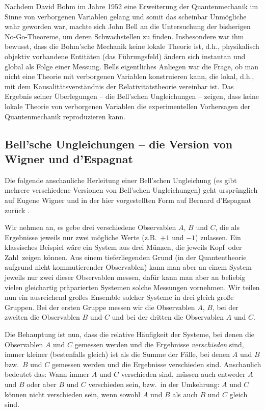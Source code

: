 Nachdem David Bohm im Jahre 1952 
eine Erweiterung der Quantenmechanik im Sinne von verborgenen
Variablen gelang und somit das scheinbar Unm\"ogliche
wahr geworden war, machte sich John Bell an die
Untersuchung der bisherigen No-Go-Theoreme,
um deren Schwachstellen zu finden. Insbesondere
war ihm bewusst, dass die 
Bohm'sche Mechanik
keine lokale Theorie ist, d.h., physikalisch objektiv
vorhandene Entit\"aten (das F\"uhrungsfeld) \"andern
sich instantan und global als Folge einer Messung. 
Bells eigentliches Anliegen war die Frage, 
ob man nicht eine Theorie mit
verborgenen Variablen konstruieren kann, die
lokal, d.h., mit dem Kausalit\"atsverst\"andnis
der Relativit\"atstheorie vereinbar ist. Das Ergebnis
seiner \"Uberlegungen -- die Bell'schen 
Ungleichungen -- zeigen, dass keine lokale Theorie von 
verborgenen Variablen
die experimentellen Vorhersagen der Quantenmechanik
reproduzieren kann.

\subsection{Bell'sche Ungleichungen -- die Version von
Wigner und d'Espagnat}
\label{sec_Espagnat}

Die folgende anschauliche Herleitung einer 
Bell'schen Ungleichung (es gibt mehrere verschiedene
Versionen 
von Bell'schen Ungleichungen) geht urspr\"unglich
auf Eugene Wigner 
und in der hier vorgestellten Form
auf 
Bernard d'Espagnat zur\"uck \cite{Espagnat}.

Wir nehmen an, es gebe drei verschiedene Observablen
$A$, $B$ und $C$, die als Ergebnisse jeweils nur zwei
m\"ogliche Werte (z.B.\ $+1$ und $-1$) zulassen. Ein klassisches
Beispiel w\"are ein System aus drei M\"unzen, die
jeweils \glqq Kopf\grqq\ oder \glqq Zahl\grqq\ zeigen
k\"onnen. Aus einem tieferliegenden Grund (in der Quantentheorie
aufgrund nicht kommutierender Observablen) kann man aber
an einem System jeweils nur zwei dieser Observablen
messen, daf\"ur kann man aber an beliebig vielen
gleichartig pr\"aparierten Systemen solche
Messungen vornehmen. Wir teilen nun ein ausreichend
gro\ss es Ensemble solcher Systeme in drei gleich
gro\ss e Gruppen. Bei der ersten Gruppe messen
wir die Observablen $A$, $B$, bei der zweiten die
Observablen $B$ und $C$ und bei der dritten die
Observablen $A$ und $C$.

Die Behauptung ist nun, dass die relative H\"aufigkeit
der Systeme, bei denen die Observablen $A$ und
$C$ gemessen werden und die Ergebnisse {\em verschieden} 
sind, immer kleiner (bestenfalls gleich) ist als die Summe der F\"alle, bei denen
$A$ und $B$ bzw.\ $B$ und $C$ gemessen werden und 
die Ergebnisse verschieden sind.
Anschaulich bedeutet das: Wann immer $A$ und $C$ 
verschieden sind, m\"ussen auch entweder $A$ und $B$
oder aber $B$ und $C$ verschieden
sein, bzw.\ in der Umkehrung: $A$ und $C$ k\"onnen
nicht verschieden sein, wenn sowohl $A$ und $B$ als auch
$B$ und $C$ gleich sind.

